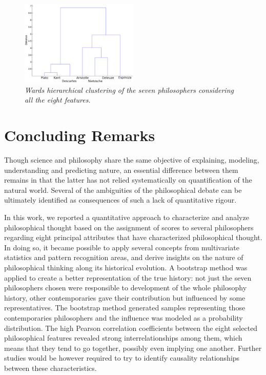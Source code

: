 \documentclass[%
 aip,
 jmp,%
 amsmath,amssymb,
 reprint,%
]{revtex4-1}
\begin{document}
\begin{figure}
        \begin{center}
                \includegraphics[width=0.5\textwidth]{Dendrogram_.eps}
        \end{center}
        \caption{\it Wards  hierarchical clustering of the seven
                    philosophers considering all the eight features.}
        \label{fig.hier}
\end{figure}



\section{Concluding Remarks}

Though science and philosophy share the same objective of explaining,
modeling, understanding and predicting nature, an essential difference
between them remains in that the latter has not relied systematically
on quantification of the natural world.  Several of the ambiguities of
the philosophical debate can be ultimately identified as consequences
of such a lack of quantitative rigour.

In this work, we reported a quantitative approach to characterize and
analyze philosophical thought based on the assignment of scores to
several philosophers regarding eight principal attributes that have
characterized philosophical thought.  In doing so, it became possible
to apply several concepts from multivariate statistics and pattern
recognition areas, and derive insights on the nature of philosophical
thinking along its historical evolution.  A bootstrap method was
applied to create a better representation of the true history: not
just the seven philosophers chosen were responsible to development of
the whole philosophy history, other contemporaries gave their
contribution but influenced by some representatives. The bootstrap
method generated samples representing those contemporaries
philosophers and the influence was modeled as a probability
distribution. The high Pearson correlation
coefficients between the eight selected philosophical features
revealed strong interrelationships among them, which means that they
tend to go together, possibly even implying one another.  Further
studies would be however required to try to identify causality
relationships between these characteristics.
\end{document}
